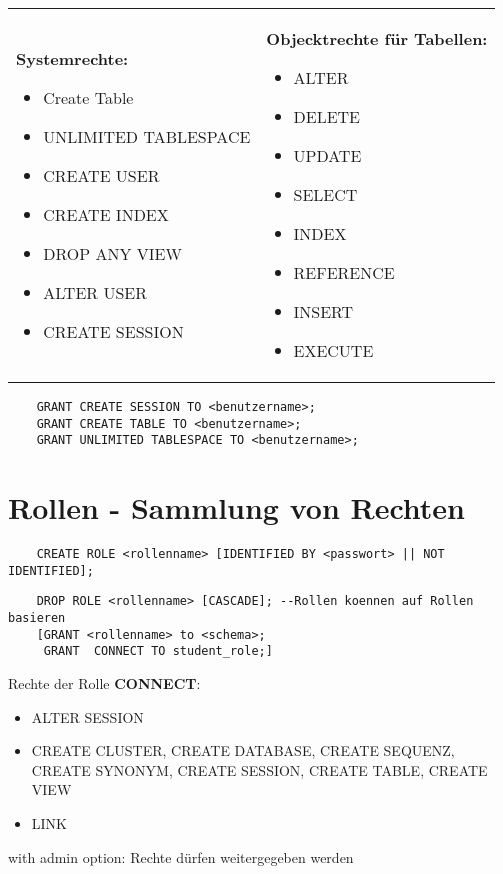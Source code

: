 \documentclass[12pt]{scrreprt}
\begin{document}
\begin{tabular}{ll}
 \parbox{7cm}{
 \textbf{Systemrechte:}
\begin{itemize}
	\item Create Table
	\item UNLIMITED TABLESPACE
	\item CREATE USER
	\item CREATE INDEX
	\item DROP ANY VIEW
	\item ALTER USER
	\item CREATE SESSION
\end{itemize}}
 &
 \parbox{10cm}{
 \textbf{Objecktrechte für Tabellen:}
\begin{itemize}
	\item ALTER
	\item DELETE
	\item UPDATE
	\item SELECT
	\item INDEX
	\item REFERENCE
	\item INSERT
	\item EXECUTE
\end{itemize}}
\end{tabular}

\begin{lstlisting}
	GRANT CREATE SESSION TO <benutzername>;
	GRANT CREATE TABLE TO <benutzername>;
	GRANT UNLIMITED TABLESPACE TO <benutzername>;
\end{lstlisting}

\section{Rollen - Sammlung von Rechten}
\begin{lstlisting}
	CREATE ROLE <rollenname> [IDENTIFIED BY <passwort> || NOT IDENTIFIED];
\end{lstlisting}
\begin{lstlisting}
	DROP ROLE <rollenname> [CASCADE]; --Rollen koennen auf Rollen basieren
	[GRANT <rollenname> to <schema>;
	 GRANT  CONNECT TO student_role;]
\end{lstlisting}
\newpage

Rechte der Rolle \textbf{CONNECT}:
\begin{itemize}
	\item ALTER SESSION
	\item CREATE CLUSTER, CREATE DATABASE, CREATE SEQUENZ, CREATE SYNONYM, CREATE SESSION, CREATE TABLE, CREATE VIEW
	\item LINK
\end{itemize}
with admin option: Rechte dürfen weitergegeben werden\newline
\end{document}
